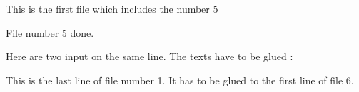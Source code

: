 This is the first file which includes the number 5


File number 5 done. 

Here are two input on the same line. The texts have to be glued :


This is the last line of file number 1. It has to be glued to the first line of file 6.
